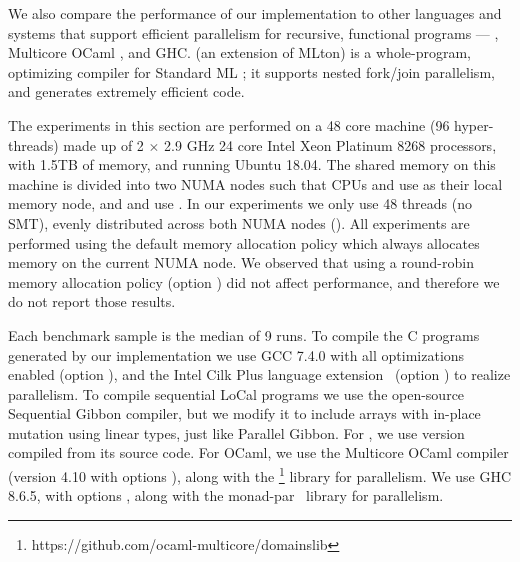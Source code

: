 \documentclass[acmsmall,acmthm=false,nonacm]{acmart}
\theoremstyle{straighttext0}
\theoremstyle{straighttext}
\newcommand{\new}[1]{#1}
\begin{document}
{We also compare the performance of our implementation
to other languages and systems
that support efficient parallelism for recursive, functional programs
--- \MPL{} \cite{MPL},
Multicore OCaml \cite{OCaml,multicore-ocaml}, and GHC.
%
\MPL{} (an extension of MLton) %
is a whole-program, optimizing compiler for Standard ML \cite{StandardML};
%
it supports nested fork/join parallelism, and generates extremely efficient code.
%


The experiments in this section are performed on a 48 core machine
(96 hyper-threads) made up of
2 $\times$ 2.9 GHz 24 core Intel Xeon Platinum 8268 processors, with 1.5TB of memory,
and running Ubuntu 18.04.
%
The shared memory on this machine is divided into two NUMA nodes
such that CPUs  and  use  as their local memory node,
and  and  use .
%
In our experiments we only use 48 threads (no SMT), evenly distributed across
both NUMA nodes ().
%
All experiments are performed using the default memory allocation policy
which always allocates memory on the current NUMA node.
%
We observed that using a round-robin memory allocation policy
(option ) did not affect performance,
and therefore we do not report those results.


Each benchmark sample is the median of 9 runs.
%
To compile the C programs generated by our implementation we use
GCC 7.4.0 with all optimizations enabled (option ), and
the Intel Cilk Plus language extension~\cite{blumofe1996cilk}
(option ) to realize parallelism.
%
To compile sequential LoCal programs we use the open-source Sequential Gibbon compiler, \new{but we modify it to include arrays with in-place mutation using linear types, just like Parallel Gibbon.}
%
For \MPL{}, we use version  compiled from its source code.
%
For OCaml, we use the Multicore OCaml compiler \cite{multicore-ocaml}
(version 4.10 with options ),
along with the  \footnote{https://github.com/ocaml-multicore/domainslib}
library for parallelism.
%
We use GHC 8.6.5, with options , along with
the monad-par~\cite{monad-par} library for parallelism.


}
\end{document}
